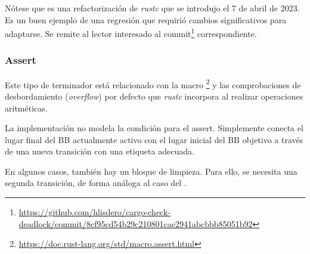Nótese que  es una refactorización de \emph{rustc}
que se introdujo el 7 de abril de 2023.
Es un buen ejemplo de una regresión que requirió cambios significativos para
adaptarse.
Se remite al lector interesado al commit\footnote{\url{https://github.com/hlisdero/cargo-check-deadlock/commit/8cf95cd54b29c210801cae2941abcbbb85051b92}}
correspondiente.

\subsubsection{Assert}

Este tipo de terminador está relacionado con la macro \footnote{\url{https://doc.rust-lang.org/std/macro.assert.html}}
y las comprobaciones de desbordamiento (\textit{overflow}) por defecto que
\emph{rustc} incorpora al realizar operaciones aritméticas.

La implementación no modela la condición para el assert. Simplemente conecta el lugar
final del \acrshort{BB} actualmente activo con el lugar inicial del \acrshort{BB} objetivo
a través de una nueva transición con una etiqueta adecuada.

En algunos casos, también hay un bloque de limpieza. Para ello, se necesita una segunda
transición, de forma análoga al caso del .